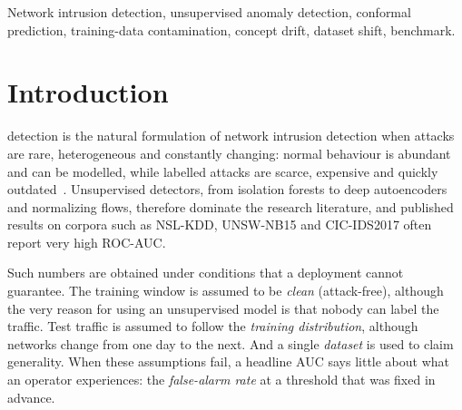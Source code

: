 \documentclass[journal]{IEEEtran}
\begin{document}
\begin{IEEEkeywords}
Network intrusion detection, unsupervised anomaly detection, conformal prediction, training-data contamination, concept drift, dataset shift, benchmark.
\end{IEEEkeywords}

\section{Introduction}
 detection is the natural formulation of network intrusion detection when attacks are rare, heterogeneous and constantly changing: normal behaviour is abundant and can be modelled, while labelled attacks are scarce, expensive and quickly outdated~\cite{sommer2010,garciateodoro2009,arp2022}. Unsupervised detectors, from isolation forests to deep autoencoders and normalizing flows, therefore dominate the research literature, and published results on corpora such as NSL-KDD, UNSW-NB15 and CIC-IDS2017 often report very high ROC-AUC.

Such numbers are obtained under conditions that a deployment cannot guarantee. The training window is assumed to be \emph{clean} (attack-free), although the very reason for using an unsupervised model is that nobody can label the traffic. Test traffic is assumed to follow the \emph{training distribution}, although networks change from one day to the next. And a single \emph{dataset} is used to claim generality. When these assumptions fail, a headline AUC says little about what an operator experiences: the \emph{false-alarm rate} at a threshold that was fixed in advance.
\end{document}
